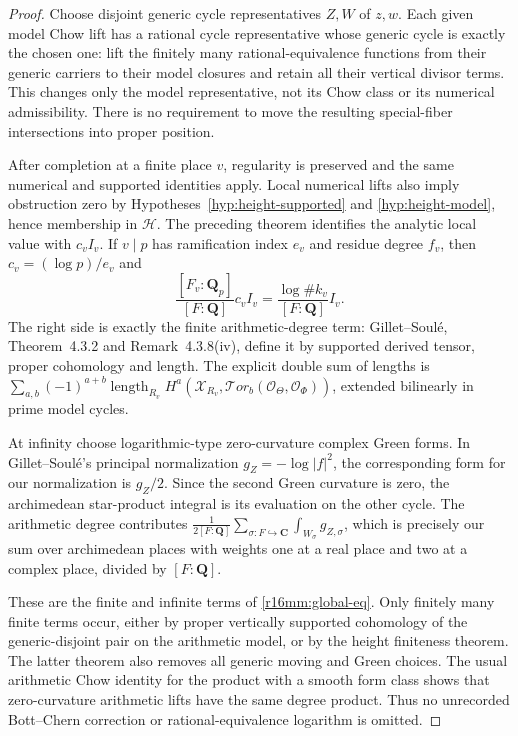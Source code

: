 \documentclass[11pt,a4paper]{article}
\theoremstyle{definition}
\theoremstyle{remark}
\numberwithin{equation}{section}
\begin{document}
\begin{proof}
Choose disjoint generic cycle representatives $Z,W$ of $z,w$.
Each given model Chow lift has a rational cycle representative
whose generic cycle is exactly the chosen one: lift the finitely
many rational-equivalence functions from their generic carriers
to their model closures and retain all their vertical divisor
terms. This changes only the model representative, not its
Chow class or its numerical admissibility. There is no requirement
to move the resulting special-fiber intersections into proper
position.

After completion at a finite place $v$, regularity is preserved
and the same numerical and supported identities apply. Local
numerical lifts also imply obstruction zero by
Hypotheses~\ref{hyp:height-supported} and \ref{hyp:height-model}, hence membership in $\mathcal H$. The preceding
theorem identifies the analytic local value with $c_v I_v$.
If $v\mid p$ has ramification index $e_v$ and residue degree
$f_v$, then $c_v=(\log p)/e_v$ and
\[
 \frac{[F_v:\mathbf Q_p]}{[F:\mathbf Q]}c_v I_v
             =\frac{\log\#k_v}{[F:\mathbf Q]}I_v.
 \tag{MM16.11}\label{r16mm:weight}
\]
The right side is exactly the finite arithmetic-degree term:
Gillet--Soul\'e, Theorem~4.3.2 and Remark~4.3.8(iv), define it
by supported derived tensor, proper cohomology and length.
The explicit double sum of lengths is
$\sum_{a,b}(-1)^{a+b}\operatorname{length}_{R_v}
H^a(\mathcal X_{R_v},\mathcal{T}or_b(\mathcal O_{\Theta},
\mathcal O_{\Phi}))$, extended bilinearly in prime model cycles.

At infinity choose logarithmic-type zero-curvature complex
Green forms. In Gillet--Soul\'e's principal normalization
$g_Z=-\log|f|^2$, the corresponding form for our normalization
is $g_Z/2$. Since the second Green curvature is zero, the
archimedean star-product integral is its evaluation on the
other cycle. The arithmetic degree contributes
$\frac1{2[F:\mathbf Q]}\sum_{\sigma:F\hookrightarrow\mathbf C}
\int_{W_\sigma}g_{Z,\sigma}$, which is precisely our sum over
archimedean places with weights one at a real place and two
at a complex place, divided by $[F:\mathbf Q]$.

These are the finite and infinite terms of
\eqref{r16mm:global-eq}. Only finitely many finite terms occur,
either by proper vertically supported cohomology of the
generic-disjoint pair on the arithmetic model, or by the
height finiteness theorem. The latter theorem
also removes all generic moving and Green choices. The usual
arithmetic Chow identity for the product with a smooth form
class shows that zero-curvature arithmetic lifts have the
same degree product. Thus no unrecorded Bott--Chern correction
or rational-equivalence logarithm is omitted.
\end{proof}
\end{document}
